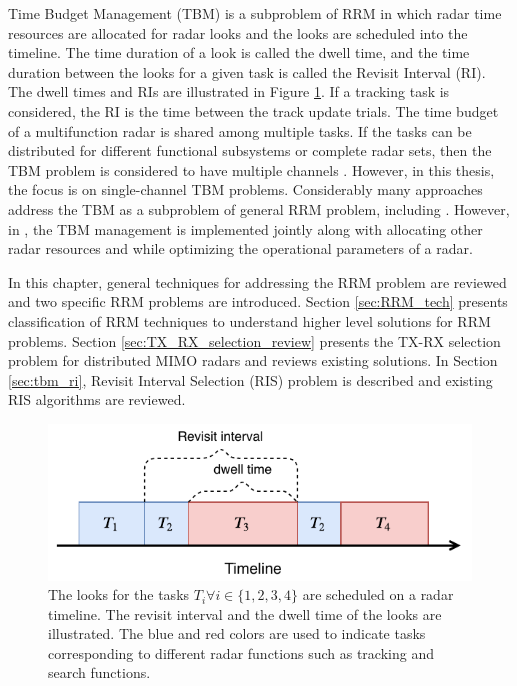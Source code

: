 \documentclass[english, 12pt, a4paper, elec, utf8, a-1b, online]{aaltothesis}
\numberwithin{equation}{section}
\begin{document}
Time Budget Management (TBM) is a subproblem of RRM in which radar time resources are allocated for radar looks and the looks are scheduled into the timeline. 
The time duration of a look is called the dwell time, and the time duration between the looks for a given task is called the Revisit Interval (RI). 
The dwell times and RIs are illustrated in Figure \ref{fig:timeline}. 
If a tracking task is considered, the RI is the time between the track update trials. 
The time budget of a multifunction radar is shared among multiple tasks.
If the tasks can be distributed for different functional subsystems or complete radar sets, then the TBM problem is considered to have multiple channels \cite{Shaghaghi2018}.
However, in this thesis, the focus is on single-channel TBM problems.
Considerably many approaches address the TBM as a subproblem of general RRM problem, including \cite{Koch1999, Wintenby2006, Byrne2016, Xu2010}. 
However, in \cite{Rajkumar1997, Irci2010, Charlish2015a}, the TBM management is implemented jointly along with allocating other radar resources and while optimizing the operational parameters of a radar.


In this chapter, general techniques for addressing the RRM problem are reviewed and two specific RRM problems are introduced.
Section \ref{sec:RRM_tech} presents classification of RRM techniques to understand higher level solutions for RRM problems.
Section \ref{sec:TX_RX_selection_review} presents the TX-RX selection problem for distributed MIMO radars and reviews existing solutions. 
In Section \ref{sec:tbm_ri}, Revisit Interval Selection (RIS) problem is described and existing RIS algorithms are reviewed.


\begin{figure}[h]
    \centering
    \includegraphics{figures/timeline.pdf}
    \caption{
        The looks for the tasks $T_i \forall i\in\{1,2,3,4\}$ are scheduled on a radar timeline. 
        The revisit interval and the dwell time of the looks are illustrated.
        The blue and red colors are used to indicate tasks corresponding to different radar functions such as tracking and search functions.
    }
    \label{fig:timeline}
\end{figure}
\end{document}
